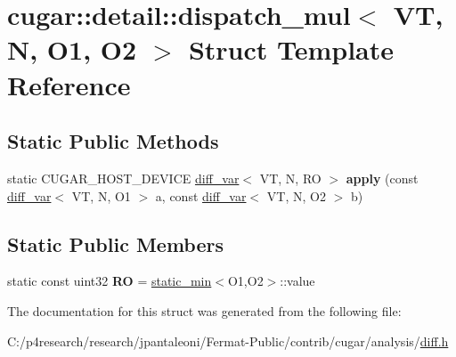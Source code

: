 \hypertarget{structcugar_1_1detail_1_1dispatch__mul}{}\section{cugar\+:\+:detail\+:\+:dispatch\+\_\+mul$<$ VT, N, O1, O2 $>$ Struct Template Reference}
\label{structcugar_1_1detail_1_1dispatch__mul}
\subsection*{Static Public Methods}
\begin{DoxyCompactItemize}
\item 
\mbox{\label{structcugar_1_1detail_1_1dispatch__mul_a582da21501028d46d221fdbb54ebb83b}} 
static C\+U\+G\+A\+R\+\_\+\+H\+O\+S\+T\+\_\+\+D\+E\+V\+I\+CE \hyperlink{structcugar_1_1diff__var}{diff\+\_\+var}$<$ VT, N, RO $>$ {\bfseries apply} (const \hyperlink{structcugar_1_1diff__var}{diff\+\_\+var}$<$ VT, N, O1 $>$ a, const \hyperlink{structcugar_1_1diff__var}{diff\+\_\+var}$<$ VT, N, O2 $>$ b)
\end{DoxyCompactItemize}
\subsection*{Static Public Members}
\begin{DoxyCompactItemize}
\item 
\mbox{\label{structcugar_1_1detail_1_1dispatch__mul_a639d51f4d1f473b2b0fd673cbae00930}} 
static const uint32 {\bfseries RO} = \hyperlink{structcugar_1_1static__min}{static\+\_\+min}$<$O1,O2$>$\+::value
\end{DoxyCompactItemize}


The documentation for this struct was generated from the following file\+:\begin{DoxyCompactItemize}
\item 
C\+:/p4research/research/jpantaleoni/\+Fermat-\/\+Public/contrib/cugar/analysis/\hyperlink{diff_8h}{diff.\+h}\end{DoxyCompactItemize}
